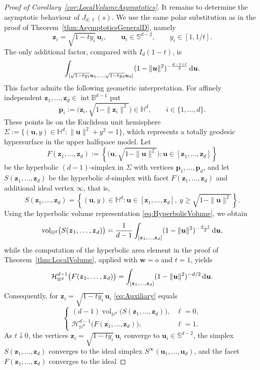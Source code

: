 \documentclass[11pt,a4paper]{article}
\theoremstyle{plain}
\theoremstyle{definition}
\theoremstyle{remark}
\newcommand{\dint}{\textup{d}}
\newcommand{\vol}{\mathop{\mathrm{vol}}\nolimits}
\newcommand{\bz}{\boldsymbol{z}}
\newcommand{\bu}{\boldsymbol{u}}
\newcommand{\bw}{\boldsymbol{w}}
\def\BB{\mathbb{B}}
\def\HH{\mathbb{H}}
\def\SS{\mathbb{S}}
\def\bp{\mathbf{p}}
\def\cH{\mathcal{H}}
\newcommand{\inter}{\operatorname{int}}
\begin{document}
\begin{proof}[Proof of Corollary~\ref{cor:LocalVolumeAsymptotics}]
	It remains to determine the asymptotic behaviour of
	$J_{d,\ell}(s)$. We use the same polar substitution as in the proof of
	Theorem~\ref{thm:AsymptoticsGeneralD}, namely
	\[
		\bz_i=\sqrt{1-t y_i}\,\bu_i,
		\qquad
		\bu_i\in\SS^{d-2},
		\qquad
		y_i\in[1,1/t].
	\]
	The only additional factor, compared with $I_d(1-t)$, is
	\begin{equation}\label{eq:Auxiliary}
		\int_{
			[\sqrt{1-t y_1}\bu_1,\ldots,
					\sqrt{1-t y_d}\bu_d]}
		(1-\|\bu\|^2)^{-\frac{d-1+\ell}{2}}
		\,\dint\bu.
	\end{equation}
	This factor admits the following geometric interpretation. For
	affinely independent $\bz_1,\ldots,\bz_d\in\inter\BB^{d-1}$ put
	\[
		\bp_i
		:=
		\bigl(\bz_i,\sqrt{1-\|\bz_i\|^2}\bigr)\in\HH^d,
		\qquad i\in\{1,\ldots,d\}.
	\]
	These points lie on the Euclidean unit hemisphere
	$\Sigma:=\{(\bu,y)\in\HH^d:\|\bu\|^2+y^2=1\}$, which represents a
	totally geodesic hypersurface in the upper halfspace model. Let
	\[
		F(\bz_1,\ldots,\bz_d)
		:=
		\left\{
		\bigl(\bu,\sqrt{1-\|\bu\|^2}\bigr):
		\bu\in[\bz_1,\ldots,\bz_d]
		\right\}
	\]
	be the hyperbolic $(d-1)$-simplex in $\Sigma$ with vertices
	$\bp_1,\ldots,\bp_d$, and let
	$S(\bz_1,\ldots,\bz_d)$ be the hyperbolic $d$-simplex with facet
	$F(\bz_1,\ldots,\bz_d)$ and additional ideal vertex $\infty$, that is,
	\[
		S(\bz_1,\ldots,\bz_d)
		=
		\left\{
		(\bu,y)\in\HH^d:
		\bu\in[\bz_1,\ldots,\bz_d],\
		y\ge\sqrt{1-\|\bu\|^2}
		\right\}.
	\]
	Using the hyperbolic volume representation
	\eqref{eq:HyperbolicVolume}, we obtain
	\[
		\vol_{\HH^d}\bigl(S(\bz_1,\ldots,\bz_d)\bigr)
		=
		\frac{1}{d-1}
		\int_{[\bz_1,\ldots,\bz_d]}
		(1-\|\bu\|^2)^{-\frac{d-1}{2}}\,\dint\bu,
	\]
	while the computation of the hyperbolic area element in the proof of
	Theorem~\ref{thm:LocalVolume}, applied with $\bw=o$ and $t=1$,
	yields
	\[
		\cH_{\HH^d}^{d-1}\bigl(F(\bz_1,\ldots,\bz_d)\bigr)
		=
		\int_{[\bz_1,\ldots,\bz_d]}
		(1-\|\bu\|^2)^{-d/2}\,\dint\bu.
	\]
	Consequently, for $\bz_i=\sqrt{1-ty_i}\,\bu_i$ \eqref{eq:Auxiliary}
	equals
	\[
		\begin{cases}
			(d-1)\vol_{\HH^d}\bigl(S(\bz_1,\ldots,\bz_d)\bigr),
			 & \ell=0, \\[1mm]
			\cH_{\HH^d}^{d-1}\bigl(F(\bz_1,\ldots,\bz_d)\bigr),
			 & \ell=1.
		\end{cases}
	\]
	As $t\downarrow0$, the vertices $\bz_i=\sqrt{1-ty_i}\,\bu_i$
	converge to $\bu_i\in\SS^{d-2}$, the simplex
	$S(\bz_1,\ldots,\bz_d)$ converges to the ideal simplex
	$S^\infty(\bu_1,\ldots,\bu_d)$, and the facet
	$F(\bz_1,\ldots,\bz_d)$ converges to the ideal

\end{proof}
\end{document}
